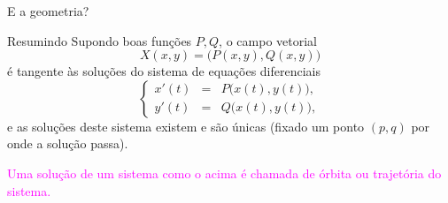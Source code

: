 \documentclass[11pt]{beamer}
\begin{document}
%
%
%
%
%
%
%
%
%
%
%
%
%



\begin{frame}[t]{E a geometria?}

\begin{block}{Resumindo}
Supondo boas funções $P,Q$, o campo vetorial \[X(x,y)=\big(P(x,y),Q(x,y)\big)\] é tangente às soluções do sistema de equações diferenciais
\[\left\{\begin{array}{lcl}
x'(t)&=&P\big(x(t),y(t)\big),\\
y'(t)&=&Q\big(x(t),y(t)\big),
\end{array}
\right.\]
e as soluções deste sistema existem e são únicas (fixado um ponto $(p,q)$ por onde a solução passa).
\end{block}

\textcolor{magenta}{Uma solução de um sistema como o acima é chamada de órbita ou trajetória do sistema.}

\end{frame}

%
%
%
%
%
\end{document}
